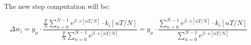 The new step computation will be:

\begin{equation}
    \Delta w_i = y_{\mu} \cdot \frac{\frac{T}{N}\sum_{n=0}^{N-1} e^{\beta \cdot v[nT/N]} \cdot k_i[nT/N]}{\frac{T}{N}\sum_{n=0}^{N-1} e^{\beta \cdot v[nT/N]}} = y_{\mu} \cdot \frac{\sum_{n=0}^{N-1} e^{\beta \cdot v[nT/N]} \cdot k_i[nT/N]}{\sum_{n=0}^{N-1} e^{\beta \cdot v[nT/N]}}
\end{equation}

